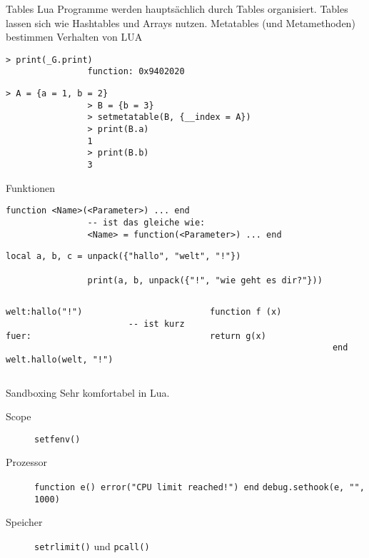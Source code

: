 \documentclass{beamer}
\begin{document}
		\begin{frame}[fragile,shrink=5]{Tables}
			Lua Programme werden hauptsächlich durch Tables organisiert.
			Tables lassen sich wie Hashtables und Arrays nutzen.
			Metatables (und Metamethoden) bestimmen Verhalten von LUA
			\begin{lstlisting}[title={\_G}]
				> print(_G.print)
				function: 0x9402020
			\end{lstlisting}

			\begin{lstlisting}[title={\_\_index}]
				> A = {a = 1, b = 2}
				> B = {b = 3}
				> setmetatable(B, {__index = A})
				> print(B.a)
				1
				> print(B.b)
				3
			\end{lstlisting}
		\end{frame}
		
		\begin{frame}[fragile,shrink=5]{Funktionen}
			\lstset{numbers=none}
			\begin{lstlisting}[title={Schreibweise}]
				function <Name>(<Parameter>) ... end
				-- ist das gleiche wie:
				<Name> = function(<Parameter>) ... end
			\end{lstlisting}

			\begin{lstlisting}[title={Mehrere Rückgabewerte}]
				local a, b, c = unpack({"hallo", "welt", "!"})

				print(a, b, unpack({"!", "wie geht es dir?"}))
			\end{lstlisting}
			
			\begin{columns}
					\begin{lstlisting}[title={OOP}]
						welt:hallo("!")
						-- ist kurz fuer:
						welt.hallo(welt, "!")
					\end{lstlisting}
				
					\begin{lstlisting}[title={Proper Tail Calls}]
						function f (x)
						  return g(x)
						end
					\end{lstlisting}
			\end{columns}
		\end{frame}
		
		\begin{frame}[fragile]{Sandboxing}
			Sehr komfortabel in Lua.

			\begin{description}
				\item[Scope] \verb+setfenv()+
				\item[Prozessor] \verb+function e() error("CPU limit reached!") end+ \verb+debug.sethook(e, "", 1000)+
				\item[Speicher] \verb+setrlimit()+ und \verb+pcall()+
			\end{description}
		\end{frame}
		
\end{document}
